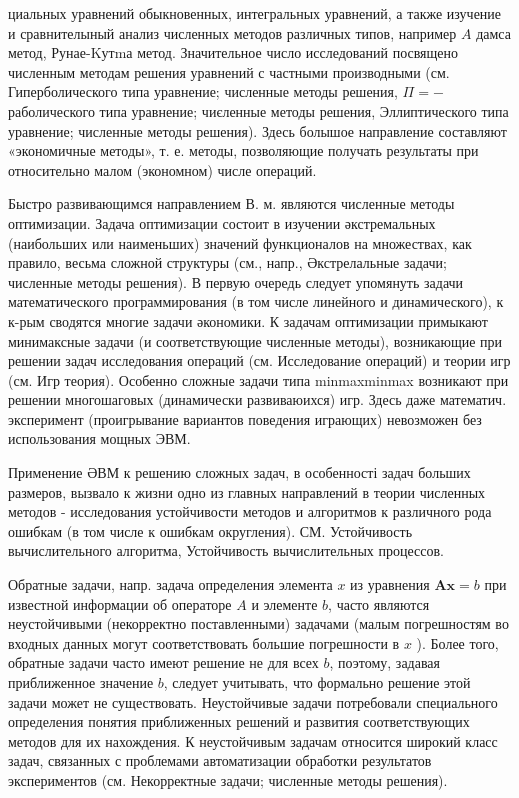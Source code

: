 \documentclass[10pt]{article}
\begin{document}
циальных уравнений обыкновенных, интегральных уравнений, а также изучение и сравнителыный анализ численных методов различных типов, например $A$ дамса метод, Рунае-Kутmа метод. Значительное число исследований посвящено численным методам решения уравнений с частными производными (см. Гиперболического типа уравнение; численные методы решения, $\Pi=-$ раболического типа уравнение; чиєленные методы решения, Эллиптического типа уравнение; численные методы решения). Здесь болышое направление составляют «экономичные методы», т. е. методы, позволяющие получать результаты при относительно малом (экономном) числе операций.



Быстро развивающимся направлением В. м. являются численные методы оптимизации. Задача оптимизации состоит в изучении әкстремальных (наибольших или наименьших) значений функционалов на множествах, как правило, весьма сложной структуры (см., напр., Әкстрелальные задачи; численные методы решения). В первую очередь следует упомянуть задачи математического программирования (в том числе линейного и динамического), к к-рым сводятся многие задачи әкономики. К задачам оптимизации примыкают минимаксные задачи (и соответствующие численные методы), возникающие при решении задач исследования операций (см. Исследование операций) и теории игр (см. Игр теория). Особенно сложные задачи типа minmaxminmax возникают при решении многошаговых (динамически развиваюихся) игр. Здесь даже математич. эксперимент (проигрывание вариантов поведения играющих) невозможен без использования мощных ЭВМ.



Применение ӘВМ к решению сложных задач, в особенності задач больших размеров, вызвало к жизни одно из главных направлений в теории численных методов - исследования устойчивости методов и алгоритмов к различного рода ошибкам (в том числе к ошибкам округления). СМ. Устойчивость вычислительного алгоритма, Устойчивость вычислительных процессов.



Обратные задачи, напр. задача определения элемента $x$ из уравнения $\boldsymbol{A} \boldsymbol{x}=b$ при известной информации об операторе $A$ и элементе $b$, часто являются неустойчивыми (некорректно поставленными) задачами (малым погрешностям во входных данных могут соответствовать большие погрешности в $x$ ). Более того, обратные задачи часто имеют решение не для всех $b$, поэтому, задавая приближенное значение $b$, следует учитывать, что формально решение этой задачи может не существовать. Неустойчивые задачи потребовали специального определения понятия приближенных решений и развития соответствующих методов для их нахождения. К неустойчивым задачам относится широкий класс задач, связанных с проблемами автоматизации обработки результатов экспериментов (см. Некорректные задачи; численные методы решения).
\end{document}
